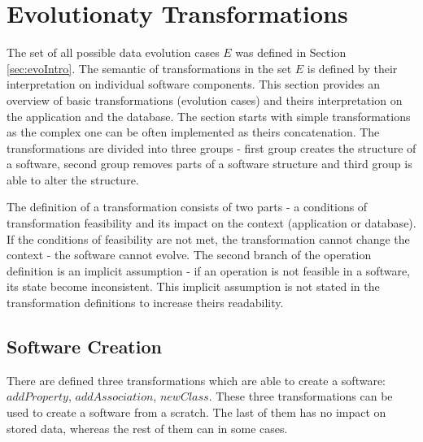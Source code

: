 \documentclass[11pt]{article}
\begin{document}
\section{Evolutionaty Transformations}
The set of all possible data evolution cases $E$ was defined in Section \ref{sec:evoIntro}. The semantic of transformations in the set $E$ is defined by their interpretation on individual software components. This section provides an overview of basic transformations (evolution cases) and theirs interpretation on the application and the database. The section starts with simple transformations as the complex one can be often implemented as theirs concatenation. The transformations are divided into three groups - first group creates the structure of a software, second group removes parts of a software structure and third group is able to alter the structure.

The definition of a transformation consists of two parts - a conditions of transformation feasibility and its impact on the context (application or database). If the conditions of feasibility are not met, the transformation cannot change the context - the software cannot evolve. The second branch of the operation definition is an implicit assumption - if an operation is not feasible in a software, its state become inconsistent. This implicit assumption is not stated in the transformation definitions to increase theirs readability.


\subsection{Software Creation}
There are defined three transformations which are able to create a software: $addProperty$, $addAssociation$,  $newClass$. These three transformations can be used to create a software from a scratch. The last of them has no impact on stored data, whereas the rest of them can in some cases.
\end{document}
